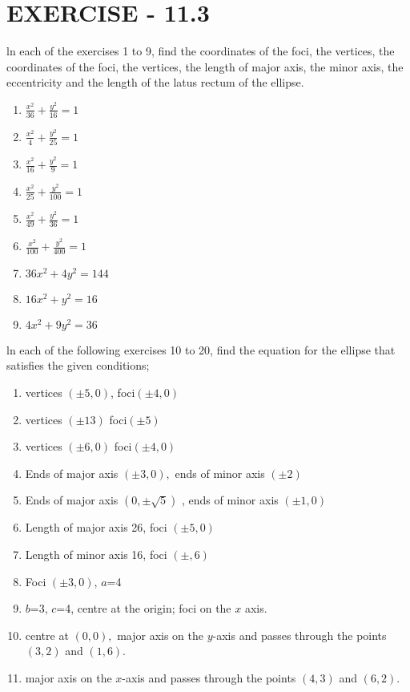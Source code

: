 \documentclass[12pt]{article}
\begin{document}
\section*{EXERCISE - 11.3}
ln each of the exercises 1 to 9, find the coordinates of the foci, the vertices, the coordinates of the foci, the vertices, the length of major axis, the minor axis, the eccentricity and the length of the latus rectum of the ellipse.
\begin{enumerate}
\item $\frac{x^2}{36}+\frac{y^2}{16}=1$
\item $\frac{x^2}{4}+\frac{y^2}{25}=1$
\item $\frac{x^2}{16}+\frac{y^2}{9}=1$
\item $\frac{x^2}{25}+\frac{y^2}{100}=1$
\item $\frac{x^2}{49}+\frac{y^2}{36}=1$
\item $\frac{x^2}{100}+\frac{y^2}{400}=1$
\item $36x^2+4y^2=144$
\item $16x^2+y^2=16$
\item $4x^2+9y^2=36$
\end{enumerate}
ln each of the following exercises 10 to 20, find the equation for the ellipse that satisfies the given conditions;
\begin{enumerate}[resume]
\item vertices $(\pm5,0)$, foci$(\pm4,0)$
\item vertices $(\pm13) $  foci$(\pm5)$
\item vertices $(\pm6,0)$ foci$(\pm4,0)$
\item Ends of major axis $(\pm3,0),$ ends of minor axis $(\pm2)$
\item Ends of major axis $(0,\pm\sqrt{5})$ , ends of minor axis $(\pm1,0)$
\item Length of major axis 26, foci $(\pm5,0)$
\item Length  of minor axis 16, foci $(\pm,6)$
\item Foci $(\pm3,0)$, $a$=4
\item $b$=3, $c$=4, centre at the origin; foci on the $x$ axis.
\item centre at $(0,0),$ major axis on the $y$-axis and passes through the points $(3,2)$ and $(1,6).$
\item major axis on the $x$-axis and passes through the points $(4,3)$  and  $(6,2).$
\end{enumerate}
\end{document}

